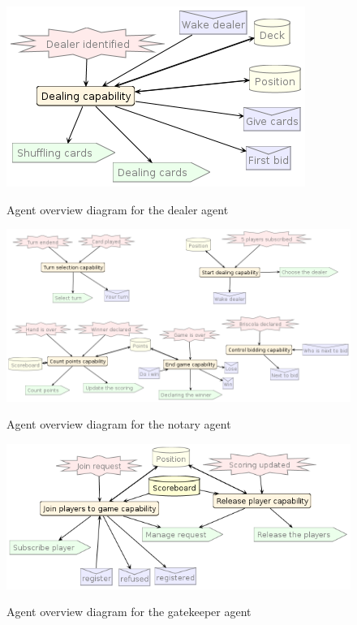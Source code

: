 \documentclass[a4paper]{article}
\begin{document}
\begin{figure}[htp]
  \centering
  \includegraphics[keepaspectratio,scale=0.45]{pdt/images/detailed_design/dealer_overview_diagram.png}
  \label{fig:dealer}
  \caption{Agent overview diagram for the dealer agent}
\end{figure}
\begin{figure}[htp]
  \centering
  \includegraphics[keepaspectratio,scale=0.45]{pdt/images/detailed_design/notary_overview_diagram.png}
  \label{fig:notary}
  \caption{Agent overview diagram for the notary agent}
\end{figure}
\begin{figure}[htp]
  \centering
  \includegraphics[keepaspectratio,scale=0.45]{pdt/images/detailed_design/gatekeeper_overview_diagram.png}
  \label{fig:gatekeeper}
  \caption{Agent overview diagram for the gatekeeper agent}
\end{figure}
\end{document}
